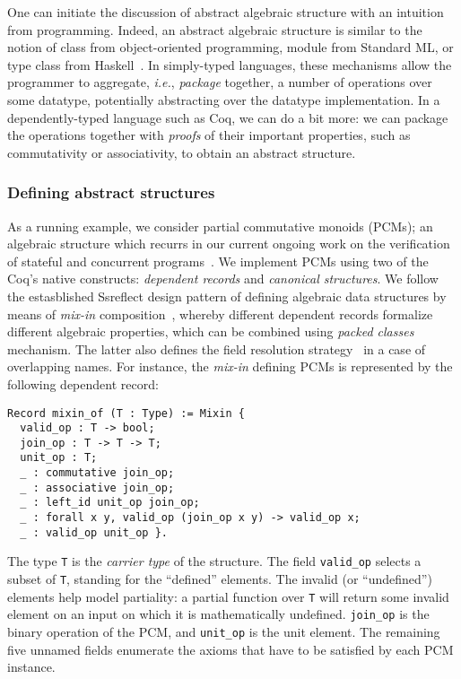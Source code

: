 \documentclass[blockstyle,preprint,nocopyrightspace]{sigplanconf}
\newcommand{\is}[1]{\textcolor{blue}{(Ilya: {#1})}}
\newcommand{\an}[1]{\textcolor{red}{(Aleks: {#1})}}
\newcommand{\code}[1]{\lstinline{#1}}
\newcommand{\ie}{\emph{i.e.}\xspace}
\begin{document}
One can initiate the discussion of abstract algebraic structure with
an intuition from programming. Indeed, an abstract algebraic structure
is similar to the notion of class from object-oriented programming,
module from Standard ML, or type class from
Haskell~\cite{Wadler-Blott:POPL89}. In simply-typed languages, these
mechanisms allow the programmer to aggregate, \ie, \emph{package}
together, a number of operations over some datatype, potentially
abstracting over the datatype implementation. In a dependently-typed
language such as Coq, we can do a bit more: we can package the
operations together with \emph{proofs} of their important properties,
such as commutativity or associativity, to obtain an abstract
structure.

\subsubsection{Defining abstract structures}
\label{sec:defin-abstr-struct}

As a running example, we consider partial commutative monoids (PCMs);
an algebraic structure which recurrs in our current ongoing work on
the verification of stateful and concurrent
programs~\cite{Nanevski-al:ESOP14}. We implement PCMs using two of the
Coq's native constructs: \emph{dependent records} and \emph{canonical
  structures}.  We follow the estasblished Ssreflect design pattern of
defining algebraic data structures by means of \emph{mix-in}
composition~\cite{Garillot:PhD}, whereby different dependent records
formalize different algebraic properties, which can be combined using
\emph{packed classes} mechanism. The latter also defines the field
resolution strategy~\cite{Garillot-al:TPHOL09} in a case of
overlapping names.
%
%
%
For instance, the \emph{mix-in} defining PCMs is represented by the
following dependent record:
%
\begin{lstlisting}
Record mixin_of (T : Type) := Mixin {
  valid_op : T -> bool;
  join_op : T -> T -> T;
  unit_op : T;
  _ : commutative join_op;
  _ : associative join_op;
  _ : left_id unit_op join_op;
  _ : forall x y, valid_op (join_op x y) -> valid_op x; 
  _ : valid_op unit_op }.
\end{lstlisting}
%
The type \code{T} is the \emph{carrier type} of the structure. The
field \code{valid_op} selects a subset of \code{T}, standing for the
``defined'' elements. The invalid (or ``undefined'') elements help
model partiality: a partial function over \code{T} will return some
invalid element on an input on which it is mathematically undefined.
\code{join_op} is the binary operation of the PCM, and \code{unit_op}
is the unit element. The remaining five unnamed fields enumerate the
axioms that have to be satisfied by each PCM instance.
\end{document}
